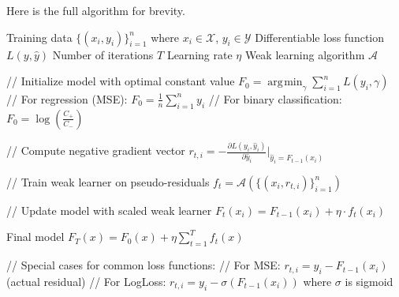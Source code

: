 \documentclass{article}
\DeclareMathOperator*{\argmin}{\arg\!\min}
\begin{document}
    \begin{algo}
      Here is the full algorithm for brevity. 
      \begin{algorithm}[H]
        \label{alg:gradboost}
        \begin{algorithmic}[1]
          \Require Training data $\{(x_i, y_i)\}_{i=1}^n$ where $x_i \in \mathcal{X}$, $y_i \in \mathcal{Y}$
          \Require Differentiable loss function $L(y, \hat{y})$
          \Require Number of iterations $T$
          \Require Learning rate $\eta$
          \Require Weak learning algorithm $\mathcal{A}$

          \State // Initialize model with optimal constant value
          \State $F_0 = \argmin_\gamma \sum_{i=1}^n L(y_i, \gamma)$
          \State // For regression (MSE): $F_0 = \frac{1}{n}\sum_{i=1}^n y_i$
          \State // For binary classification: $F_0 = \log(\frac{C_+}{C_-})$

              \State // Compute negative gradient vector
                  \State $r_{t,i} = -\frac{\partial L(y_i, \hat{y}_i)}{\partial \hat{y}_i}\big|_{\hat{y}_i = F_{t-1}(x_i)}$
              \EndFor
              
              \State // Train weak learner on pseudo-residuals
              \State $f_t = \mathcal{A}(\{(x_i, r_{t,i})\}_{i=1}^n)$
              
              \State // Update model with scaled weak learner
                  \State $F_t(x_i) = F_{t-1}(x_i) + \eta \cdot f_t(x_i)$
              \EndFor
          \EndFor

          \State \Return Final model $F_T(x) = F_0(x) + \eta \sum_{t=1}^T f_t(x)$

          \State // Special cases for common loss functions:
          \State // For MSE: $r_{t,i} = y_i - F_{t-1}(x_i)$ (actual residual)
          \State // For LogLoss: $r_{t,i} = y_i - \sigma(F_{t-1}(x_i))$ where $\sigma$ is sigmoid
        \end{algorithmic}
      \end{algorithm}
    \end{algo}
\end{document}
